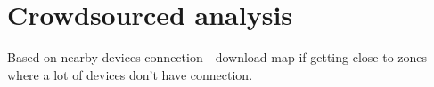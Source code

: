 \section{Crowdsourced analysis}
\label{sec:crwdsourc}

Based on nearby devices connection - download map if getting close to zones where a lot of devices don't have connection.